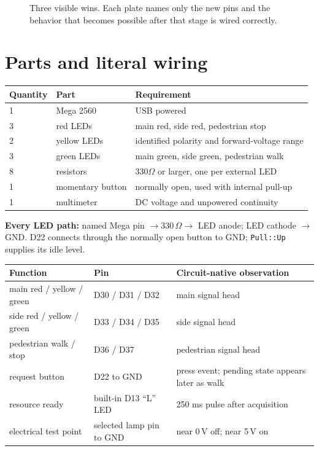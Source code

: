 \documentclass[11pt]{article}
\begin{document}
\begin{figure}[ht]
  \centering
  \resizebox{\linewidth}{!}{}
  \caption{Three visible wins. Each plate names only the new pins and the
  behavior that becomes possible after that stage is wired correctly.}
\end{figure}

\section{Parts and literal wiring}

\begin{tabularx}{\linewidth}{@{}l l X@{}}
\toprule
Quantity & Part & Requirement\\
\midrule
1 & Mega 2560 & USB powered\\
3 & red LEDs & main red, side red, pedestrian stop\\
2 & yellow LEDs & identified polarity and forward-voltage range\\
3 & green LEDs & main green, side green, pedestrian walk\\
8 & resistors & 330\(\Omega\) or larger, one per external LED\\
1 & momentary button & normally open, used with internal pull-up\\
1 & multimeter & DC voltage and unpowered continuity\\
\bottomrule
\end{tabularx}

\textbf{Every LED path:} named Mega pin \(\rightarrow330\,\Omega\rightarrow\)
LED anode; LED cathode \(\rightarrow\) GND. D22 connects through the normally
open button to GND; \texttt{Pull::Up} supplies its idle level.

\begin{tabularx}{\linewidth}{@{}l l l@{}}
\toprule
Function & Pin & Circuit-native observation\\
\midrule
main red / yellow / green & D30 / D31 / D32 & main signal head\\
side red / yellow / green & D33 / D34 / D35 & side signal head\\
pedestrian walk / stop & D36 / D37 & pedestrian signal head\\
request button & D22 to GND & press event; pending state appears later as walk\\
resource ready & built-in D13 ``L'' LED & 250 ms pulse after acquisition\\
electrical test point & selected lamp pin to GND & near 0\,V off; near 5\,V on\\
\bottomrule
\end{tabularx}
\end{document}

